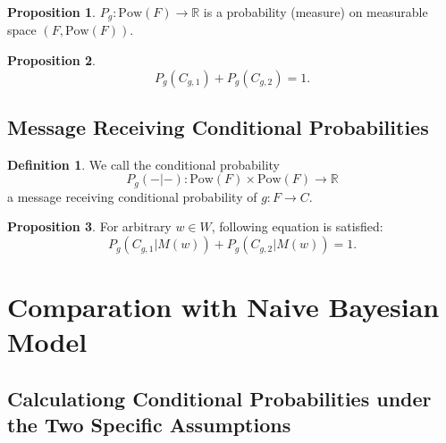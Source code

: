 \documentclass[11pt, a4note]{article}
\theoremstyle{definition}
\newtheorem{definition}{Definition}[section]
\newtheorem{proposition}{Proposition}[section]
\begin{document}
\begin{proposition}
$ P_{g} : \mathrm{Pow}(F) \to \mathbb{R} $ is a probability (measure) on measurable space $ (F, \mathrm{Pow}(F)) $.
\end{proposition}

\begin{proposition}
\begin{equation}
P_{g}(C_{g,1}) + P_{g}(C_{g,2}) = 1.
\end{equation}
\end{proposition}

\subsection{Message Receiving Conditional Probabilities}

\begin{definition}
We call the conditional probability 
\begin{equation}
P_{g}(-|-): \mathrm{Pow}(F) \times \mathrm{Pow}(F) \to \mathbb{R}
\end{equation}
a message receiving conditional probability of $ g : F \to C $.
\end{definition}

\begin{proposition}
For arbitrary $ w \in W $, following equation is satisfied:
\begin{equation}
P_{g}(C_{g,1}|M(w)) + P_{g}(C_{g,2}|M(w)) = 1.
\end{equation}
\end{proposition}

\section{Comparation with Naive Bayesian Model}

\subsection{Calculationg Conditional Probabilities under the Two Specific Assumptions}

\end{document}
